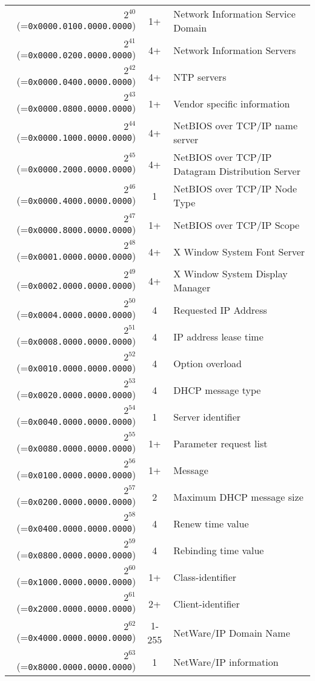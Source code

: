 \documentclass[documentation]{subfiles}
\begin{document}
\begin{small}
\begin{longtable}{rcl}
        $2^{40}$ (={\tt 0x0000.0100.0000.0000}) & 1+    & Network Information Service Domain \\
        $2^{41}$ (={\tt 0x0000.0200.0000.0000}) & 4+    & Network Information Servers \\
        $2^{42}$ (={\tt 0x0000.0400.0000.0000}) & 4+    & NTP servers \\
        $2^{43}$ (={\tt 0x0000.0800.0000.0000}) & 1+    & Vendor specific information \\
        $2^{44}$ (={\tt 0x0000.1000.0000.0000}) & 4+    & NetBIOS over TCP/IP name server \\
        $2^{45}$ (={\tt 0x0000.2000.0000.0000}) & 4+    & NetBIOS over TCP/IP Datagram Distribution Server \\
        $2^{46}$ (={\tt 0x0000.4000.0000.0000}) & 1     & NetBIOS over TCP/IP Node Type \\
        $2^{47}$ (={\tt 0x0000.8000.0000.0000}) & 1+    & NetBIOS over TCP/IP Scope \\
        $2^{48}$ (={\tt 0x0001.0000.0000.0000}) & 4+    & X Window System Font Server \\
        $2^{49}$ (={\tt 0x0002.0000.0000.0000}) & 4+    & X Window System Display Manager \\
        $2^{50}$ (={\tt 0x0004.0000.0000.0000}) & 4     & Requested IP Address \\
        $2^{51}$ (={\tt 0x0008.0000.0000.0000}) & 4     & IP address lease time \\
        $2^{52}$ (={\tt 0x0010.0000.0000.0000}) & 4     & Option overload \\
        $2^{53}$ (={\tt 0x0020.0000.0000.0000}) & 4     & DHCP message type \\
        $2^{54}$ (={\tt 0x0040.0000.0000.0000}) & 1     & Server identifier \\
        $2^{55}$ (={\tt 0x0080.0000.0000.0000}) & 1+    & Parameter request list\\
        $2^{56}$ (={\tt 0x0100.0000.0000.0000}) & 1+    & Message \\
        $2^{57}$ (={\tt 0x0200.0000.0000.0000}) & 2     & Maximum DHCP message size \\
        $2^{58}$ (={\tt 0x0400.0000.0000.0000}) & 4     & Renew time value \\
        $2^{59}$ (={\tt 0x0800.0000.0000.0000}) & 4     & Rebinding time value \\
        $2^{60}$ (={\tt 0x1000.0000.0000.0000}) & 1+    & Class-identifier \\
        $2^{61}$ (={\tt 0x2000.0000.0000.0000}) & 2+    & Client-identifier \\
        $2^{62}$ (={\tt 0x4000.0000.0000.0000}) & 1-255 & NetWare/IP Domain Name \\
        $2^{63}$ (={\tt 0x8000.0000.0000.0000}) & 1     & NetWare/IP information \\
        \bottomrule
    \end{longtable}
\end{small}
\end{document}
